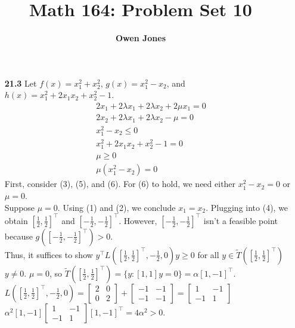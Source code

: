 \documentclass[10pt]{article}
\title{\bf Math 164: Problem Set 10}
\author{\bf Owen Jones}
\begin{document}
\maketitle
\begin{enumerate}
    \item [\textbf{21.3}] Let $f(x)=x_1^2+x_2^2$, $g(x)=x_1^2-x_2$, and $h(x)=x_1^2+2x_1x_2+x_2^2-1$. 
    \begin{align}
        &2x_1+2\lambda x_1+2\lambda x_2+2\mu x_1=0\\
        & 2x_2+2\lambda x_1+2\lambda x_2-\mu=0\\
        &x_1^2-x_2\le 0\\
        &x_1^2+2x_1x_2+x_2^2-1=0\\
        &\mu\ge 0\\
        & \mu(x_1^2-x_2)=0
    \end{align}
    First, consider (3), (5), and (6). For (6) to hold, we need either $x_1^2-x_2=0$ or $\mu=0$.\\
    Suppose $\mu=0$. Using (1) and (2), we conclude $x_1=x_2$. Plugging into (4), we obtain ${[\frac{1}{2},\frac{1}{2}]}^\top$ and ${[-\frac{1}{2},-\frac{1}{2}]}^\top$. However, ${[-\frac{1}{2},-\frac{1}{2}]}^\top$ isn't a feasible point because $g({[-\frac{1}{2},-\frac{1}{2}]}^\top)>0$.\\
    Thus, it suffices to show $y^\top L({[\frac{1}{2},\frac{1}{2}]}^\top,-\frac{1}{2},0)y\ge 0$ for all $y\in\tilde{T}({[\frac{1}{2},\frac{1}{2}]}^\top)$ $y\neq 0$. $\mu=0$, so $\tilde{T}({[\frac{1}{2},\frac{1}{2}]}^\top)=\{y: [1,1]y=0\}=\alpha{[1,-1]}^\top$.\\
    $L({[\frac{1}{2},\frac{1}{2}]}^\top,-\frac{1}{2},0)=\begin{bmatrix}
        2 & 0\\
        0 & 2
    \end{bmatrix}+\begin{bmatrix}
        -1 & -1\\
        -1 & -1
    \end{bmatrix}=\begin{bmatrix}
        1 & -1\\
        -1 & 1
    \end{bmatrix}$\\
    $\alpha^2{[1,-1]}\begin{bmatrix}
        1 & -1\\
        -1 & 1
    \end{bmatrix}{[1,-1]}^\top=4\alpha^2>0$.\\

\end{enumerate}
\end{document}
